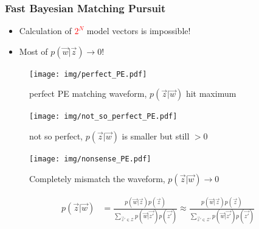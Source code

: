 \documentclass{beamer}
\begin{document}
\begin{CJK*}{UTF8}{gbsn}
\begin{frame}
    \frametitle{Fast Bayesian Matching Pursuit}
    \begin{itemize}
        \item Calculation of \textcolor{red}{$2^{N}$} model vectors is impossible!
        \item Most of $p(\vec{w}|\vec{z}) \rightarrow 0$!
    \end{itemize}
    \noindent\begin{minipage}[c]{0.33\textwidth}
        \begin{figure}[H]
            \centering
                \texttt{[image: img/perfect\_PE.pdf]}
            \caption{perfect PE matching waveform, $p(\vec{z}|\vec{w})$ hit maximum}
            \label{fig:perfect PE}
        \end{figure}
    \end{minipage}\begin{minipage}[c]{0.33\textwidth}
        \begin{figure}[H]
            \centering
                \texttt{[image: img/not\_so\_perfect\_PE.pdf]}
            \caption{not so perfect, $p(\vec{z}|\vec{w})$ is smaller but still $>0$}
            \label{fig:not so perfect PE}
        \end{figure}
    \end{minipage}\begin{minipage}[c]{0.33\textwidth}
        \begin{figure}[H]
            \centering
                \texttt{[image: img/nonsense\_PE.pdf]}
            \caption{Completely mismatch the waveform, $p(\vec{z}|\vec{w}) \rightarrow 0$}
            \label{fig:nonsense PE}
        \end{figure}
    \end{minipage}
    \begin{align*}
        p(\vec{z}|\vec{w}) &= \frac{p(\vec{w}|\vec{z})p(\vec{z})}{\sum_{\vec{z}'\in\mathcal{Z}}p(\vec{w}|\vec{z'})p(\vec{z'})} \approx \frac{p(\vec{w}|\vec{z})p(\vec{z})}{\sum_{\vec{z}'\in\mathcal{Z}'}p(\vec{w}|\vec{z'})p(\vec{z'})}
    \end{align*}
\end{frame}


\end{CJK*}
\end{document}
